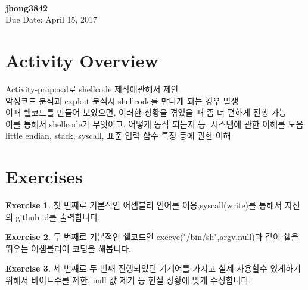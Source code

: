 \documentclass[a4paper, 11pt]{article}
\theoremstyle{definition}
\newtheorem{exercise}{Exercise}
\begin{document}
 \\
         {\phantom{} \hfill \textbf{jhong3842}} \\
         {\phantom{} \hfill Due Date: April 15, 2017} \\

\section{Activity Overview}

Activity-proposal로 shellcode 제작에관해서 제안 \\

악성코드 분석과 exploit 분석시 shellcode를 만나게 되는 경우 발생\\

이때 쉘코드를 만들어 보았으면, 이러한 상황을 겪었을 때 좀 더 편하게 진행 가능\\

이를 통해서 shellcode가 무엇이고, 어떻게 동작 되는지 등. 시스템에 관한 이해를 도음\\

little endian, stack, syscall, 표준 입력 함수 특징 등에 관한 이해

\section{Exercises}

\begin{exercise}

  첫 번째로 기본적인 어셈블리 언어를 이용,syscall(write)를 통해서 자신의 github id를 출력합니다.

\end{exercise}

\begin{exercise}

  두 번째로 기본적인 쉘코드인 execve("/bin/sh",argv,null)과 같이 쉘을 뛰우는 어셈블리어 코딩을 해봅니다.


\end{exercise}

\begin{exercise}

  세 번째로 두 번째 진행되었던 기계어를 가지고 실제 사용할수 있게하기 위해서 바이트수를 제한, null 값 제거 등 현실 상황에 맞게 수정합니다.

\end{exercise}
\end{document}
